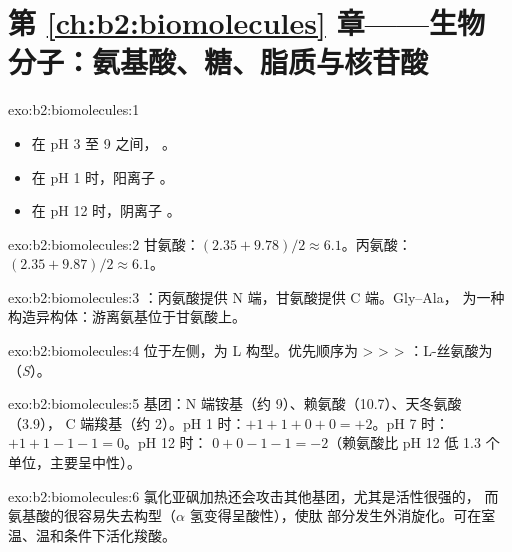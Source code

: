 \section*{第 \ref{ch:b2:biomolecules} 章——生物分子：氨基酸、糖、脂质与核苷酸}

\begin{solution}{exo:b2:biomolecules:1}
\begin{itemize}
  \item 在 pH 3 至 9 之间， 。
  \item 在 pH 1 时，阳离子 。
  \item 在 pH 12 时，阴离子 。
\end{itemize}
\end{solution}

\begin{solution}{exo:b2:biomolecules:2}
甘氨酸：$(2.35 + 9.78)/2 \approx 6.1$。丙氨酸：$(2.35 + 9.87)/2 \approx 6.1$。
\end{solution}

\begin{solution}{exo:b2:biomolecules:3}
：丙氨酸提供 N 端，甘氨酸提供 C 端。Gly--Ala，
为一种构造异构体：游离氨基位于甘氨酸上。
\end{solution}

\begin{solution}{exo:b2:biomolecules:4}
 位于左侧，为 L 构型。优先顺序为  >  >  > ：L-丝氨酸为
（\textit{S}）。
\end{solution}

\begin{solution}{exo:b2:biomolecules:5}
基团：N 端铵基（约 9）、赖氨酸（10.7）、天冬氨酸（3.9），
C 端羧基（约 2）。pH 1 时：$+1 +1 + 0 + 0 = +2$。pH 7 时：$+1 +1 -1 -1 = 0$。pH 12 时：
$0 + 0 - 1 - 1 = -2$（赖氨酸比 pH 12 低 1.3 个单位，主要呈中性）。
\end{solution}

\begin{solution}{exo:b2:biomolecules:6}
氯化亚砜加热还会攻击其他基团，尤其是活性很强的，
而氨基酸的很容易失去构型（$\alpha$ 氢变得呈酸性），使肽
部分发生外消旋化。可在室温、温和条件下活化羧酸。
\end{solution}

